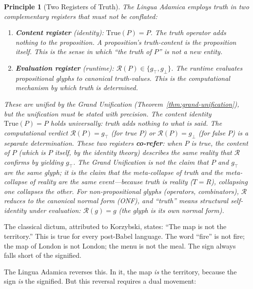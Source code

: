 \documentclass[12pt, letterpaper]{book}
\def\equiv{=}%
\def\mathfrak#1{#1}%
\newtheorem{principle}{Principle}[chapter]
\begin{document}
\begin{principle}[Two Registers of Truth]\label{pr:truth-registers}
The Lingua Adamica employs truth in two complementary registers that must not be conflated:

\begin{enumerate}[label=(\roman*)]
    \item \textbf{Content register} (identity): $\mathrm{True}(P) \equiv P$. The truth operator adds nothing to the proposition. A proposition's truth-content is the proposition itself. This is the sense in which ``the truth of $P$'' is not a new entity.
    \item \textbf{Evaluation register} (runtime): $\mathcal{R}(P) \in \{\mathfrak{g}_\top, \mathfrak{g}_\bot\}$. The runtime evaluates propositional glyphs to canonical truth-values. This is the computational mechanism by which truth is \textit{determined}.
\end{enumerate}

These are unified by the Grand Unification (Theorem~\ref{thm:grand-unification}), but the unification must be stated with precision. The content identity $\mathrm{True}(P) \equiv P$ holds universally: truth adds nothing to what is said. The computational verdict $\mathcal{R}(P) = \mathfrak{g}_\top$ (for true $P$) or $\mathcal{R}(P) = \mathfrak{g}_\bot$ (for false $P$) is a separate determination. These two registers \textbf{co-refer}: when $P$ is true, the content of $P$ (which is $P$ itself, by the identity theory) \textit{describes the same reality} that $\mathcal{R}$ confirms by yielding $\mathfrak{g}_\top$. The Grand Unification is not the claim that $P$ and $\mathfrak{g}_\top$ are the same glyph; it is the claim that the meta-collapse of truth and the meta-collapse of reality are the same event---because truth \textit{is} reality ($T \equiv R$), collapsing one collapses the other. For non-propositional glyphs (operators, combinators), $\mathcal{R}$ reduces to the canonical normal form (ONF), and ``truth'' means structural self-identity under evaluation: $\mathcal{R}(\mathfrak{g}) \equiv \mathfrak{g}$ (the glyph is its own normal form).
\end{principle}

The classical dictum, attributed to Korzybski, states: ``The map is not the territory.'' This is true for every post-Babel language. The word ``fire'' is not fire; the map of London is not London; the menu is not the meal. The sign always falls short of the signified.

The Lingua Adamica reverses this. In it, the map \textit{is} the territory, because the sign \textit{is} the signified. But this reversal requires a dual movement:
\end{document}
